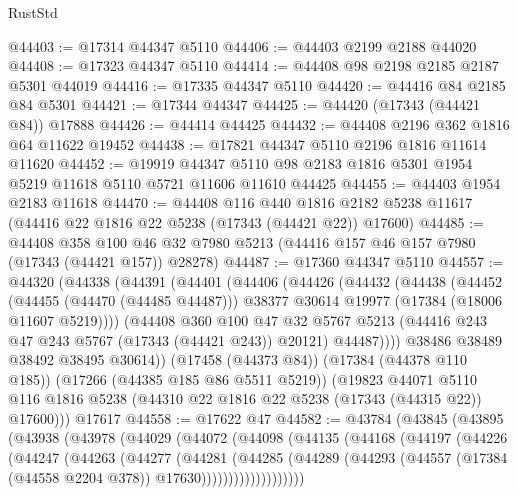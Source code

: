 \begin{lexlean}{RustStd}
\begin{coremodule}
@44403 := @17314 @44347 @5110
@44406 := @44403 @2199 @2188 @44020
@44408 := @17323 @44347 @5110
@44414 := @44408 @98 @2198 @2185 @2187 @5301 @44019
@44416 := @17335 @44347 @5110
@44420 := @44416 @84 @2185 @84 @5301
@44421 := @17344 @44347
@44425 := @44420 (@17343 (@44421 @84)) @17888
@44426 := @44414 @44425
@44432 := @44408 @2196 @362 @1816 @64 @11622 @19452
@44438 := @17821 @44347 @5110 @2196 @1816 @11614 @11620
@44452 := @19919
    @44347
    @5110
    @98
    @2183
    @1816
    @5301
    @1954
    @5219
    @11618
    @5110
    @5721
    @11606
    @11610
    @44425
@44455 := @44403 @1954 @2183 @11618
@44470 := @44408
    @116
    @440
    @1816
    @2182
    @5238
    @11617
    (@44416 @22 @1816 @22 @5238 (@17343 (@44421 @22)) @17600)
@44485 := @44408
    @358
    @100
    @46
    @32
    @7980
    @5213
    (@44416 @157 @46 @157 @7980 (@17343 (@44421 @157)) @28278)
@44487 := @17360 @44347 @5110
@44557 := @44320
    (@44338
      (@44391
        (@44401
          (@44406
            (@44426
              (@44432
                (@44438
                  (@44452
                    (@44455 (@44470 (@44485 @44487)))
                    @38377
                    @30614
                    @19977
                    (@17384 (@18006 @11607 @5219))))
                (@44408
                  @360
                  @100
                  @47
                  @32
                  @5767
                  @5213
                  (@44416 @243 @47 @243 @5767 (@17343 (@44421 @243)) @20121)
                  @44487))))
          @38486
          @38489
          @38492
          @38495
          @30614))
      (@17458 (@44373 @84))
      (@17384 (@44378 @110 @185))
      (@17266 (@44385 @185 @86 @5511 @5219))
      (@19823
        @44071
        @5110
        @116
        @1816
        @5238
        (@44310 @22 @1816 @22 @5238 (@17343 (@44315 @22)) @17600)))
    @17617
@44558 := @17622 @47
@44582 := @43784
    (@43845
      (@43895
        (@43938
          (@43978
            (@44029
              (@44072
                (@44098
                  (@44135
                    (@44168
                      (@44197
                        (@44226
                          (@44247
                            (@44263
                              (@44277
                                (@44281
                                  (@44285
                                    (@44289
                                      (@44293
                                        (@44557
                                          (@17384 (@44558 @2204 @378))
                                          @17630)))))))))))))))))))

\end{coremodule}
\end{lexlean}
